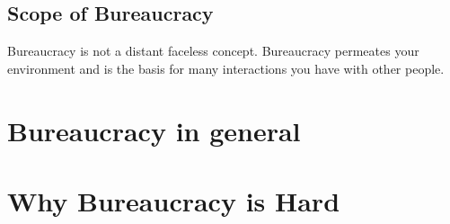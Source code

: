 \documentclass{book}
\begin{document}
  \clearpage 
  \section{Scope of Bureaucracy}
  Bureaucracy is not a distant faceless concept. Bureaucracy permeates your environment and is the basis for many interactions you have with other people. 

  \clearpage
    
    
    
     
  \clearpage
  \clearpage %

\chapter{Bureaucracy in general\label{sec:bureaucracy-in-general}}
   
  \clearpage
   
  \clearpage
  \clearpage
  \clearpage
  \clearpage 
  \clearpage
  
  
  \clearpage
   
  \clearpage
  
  \clearpage
   
  \clearpage

\chapter{Why Bureaucracy is Hard}
  \clearpage
  \clearpage
  \clearpage


\end{document}

